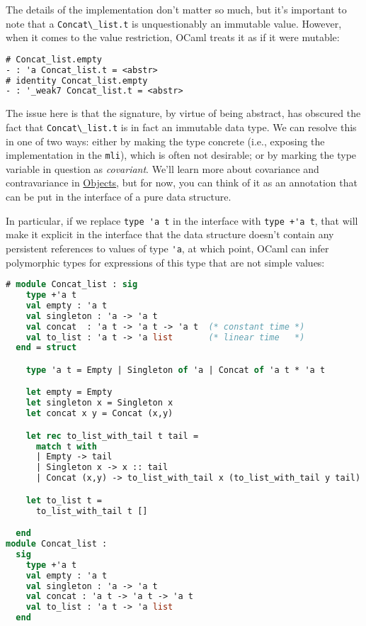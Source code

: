 The details of the implementation don't matter so much, but it's
important to note that a \passthrough{\lstinline!Concat\_list.t!} is
unquestionably an immutable value. However, when it comes to the value
restriction, OCaml treats it as if it were mutable:

\begin{lstlisting}[language=Caml]
# Concat_list.empty
- : 'a Concat_list.t = <abstr>
# identity Concat_list.empty
- : '_weak7 Concat_list.t = <abstr>
\end{lstlisting}

The issue here is that the signature, by virtue of being abstract, has
obscured the fact that \passthrough{\lstinline!Concat\_list.t!} is in
fact an immutable data type. We can resolve this in one of two ways:
either by making the type concrete (i.e., exposing the implementation in
the \passthrough{\lstinline!mli!}), which is often not desirable; or by
marking the type variable in question as \emph{covariant}. We'll learn
more about covariance and contravariance in
\href{objects.html\#objects}{Objects}, but for now, you can think of it
as an annotation that can be put in the interface of a pure data
structure. 

In particular, if we replace \passthrough{\lstinline!type 'a t!} in the
interface with \passthrough{\lstinline!type +'a t!}, that will make it
explicit in the interface that the data structure doesn't contain any
persistent references to values of type \passthrough{\lstinline!'a!}, at
which point, OCaml can infer polymorphic types for expressions of this
type that are not simple values:

\begin{lstlisting}[language=Caml]
# module Concat_list : sig
    type +'a t
    val empty : 'a t
    val singleton : 'a -> 'a t
    val concat  : 'a t -> 'a t -> 'a t  (* constant time *)
    val to_list : 'a t -> 'a list       (* linear time   *)
  end = struct

    type 'a t = Empty | Singleton of 'a | Concat of 'a t * 'a t

    let empty = Empty
    let singleton x = Singleton x
    let concat x y = Concat (x,y)

    let rec to_list_with_tail t tail =
      match t with
      | Empty -> tail
      | Singleton x -> x :: tail
      | Concat (x,y) -> to_list_with_tail x (to_list_with_tail y tail)

    let to_list t =
      to_list_with_tail t []

  end
module Concat_list :
  sig
    type +'a t
    val empty : 'a t
    val singleton : 'a -> 'a t
    val concat : 'a t -> 'a t -> 'a t
    val to_list : 'a t -> 'a list
  end
\end{lstlisting}

